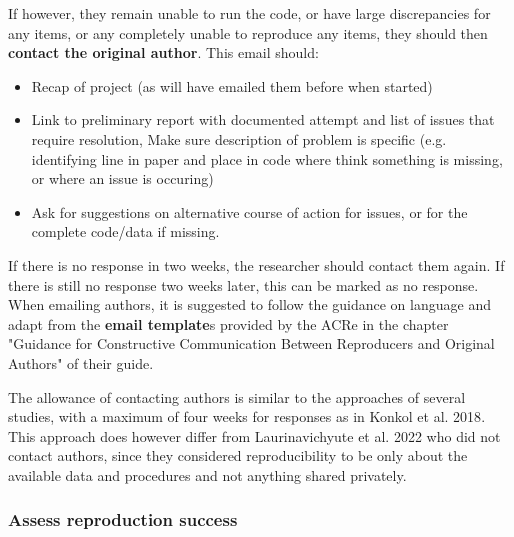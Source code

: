 If however, they remain unable to run the code, or have large discrepancies for any items, or any completely unable to reproduce any items, they should then \textbf{contact the original author}. This email should:
\begin{itemize}
    \item Recap of project (as will have emailed them before when started)
    \item Link to preliminary report with documented attempt and list of issues that require resolution, Make sure description of problem is specific (e.g. identifying line in paper and place in code where think something is missing, or where an issue is occuring)
    \item Ask for suggestions on alternative course of action for issues, or for the complete code/data if missing.
\end{itemize}

If there is no response in two weeks, the researcher should contact them again. If there is still no response two weeks later, this can be marked as no response. When emailing authors, it is suggested to follow the guidance on language and adapt from the \textbf{email template}s provided by the ACRe in the chapter "Guidance for Constructive Communication Between Reproducers and Original Authors" of their guide.\autocite{berkeley_initiative_for_transparency_in_the_social_sciences_guide_2022}

The allowance of contacting authors is similar to the approaches of several studies,\autocite{krafczyk_learning_2021,wood_push_2018,berkeley_initiative_for_transparency_in_the_social_sciences_guide_2022,hardwicke_analytic_2021,konkol_computational_2019} with a maximum of four weeks for responses as in Konkol et al. 2018\autocite{konkol_computational_2019}. This approach does however differ from Laurinavichyute et al. 2022\autocite{laurinavichyute_share_2022} who did not contact authors, since they considered reproducibility to be only about the available data and procedures and not anything shared privately.\autocite{laurinavichyute_share_2022}

\subsubsection{Assess reproduction success}
\timeyes

